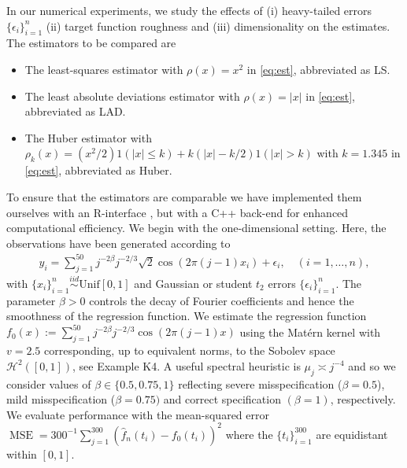 \documentclass[11pt]{article}
\theoremstyle{definition}
\theoremstyle{remark}
\DeclareMathOperator{\MSE}{MSE}
\begin{document}
In our numerical experiments, we study the effects of (i) heavy-tailed errors $\{\epsilon_i\}_{i=1}^n$ (ii) target function roughness and (iii) dimensionality on the estimates. The estimators to be compared are
\begin{itemize}
\item The least-squares estimator with $\rho(x) = x^2$ in \eqref{eq:est}, abbreviated as LS.
\item The least absolute deviations estimator with $\rho(x) = |x|$ in \eqref{eq:est}, abbreviated as LAD.
\item The Huber estimator with $\rho_{k}(x) = (x^2/2) 1(|x| \leq k) + k(|x| - k/2) 1(|x|>k)$ with $k=1.345$ in \eqref{eq:est}, abbreviated as Huber.
\end{itemize}
To ensure that the estimators are comparable we have implemented them ourselves with an \textsf{R}-interface \citep{R:2026}, but with a C++ back-end for enhanced computational efficiency. We begin with the one-dimensional setting. Here, the observations have been generated according to
\begin{align*}
y_i = \sum_{j=1}^{50} j^{-2 \beta} j^{-2/3} \sqrt{2}\cos(2 \pi(j-1) x_i) + \epsilon_i, \quad (i=1,\ldots, n),
\end{align*}
with $\{x_i\}_{i=1}^n \overset{iid}{\sim} \mathrm{Unif}[0,1]$ and Gaussian or student $t_2$ errors $\{\epsilon_i\}_{i=1}^n$. The parameter $\beta>0$ controls the decay of Fourier coefficients and hence the smoothness of the regression function. We estimate the regression function $f_0(x):=\sum_{j=1}^{50} j^{-2 \beta} j^{-2/3} \cos(2 \pi (j-1) x)$ using the Mat\'ern kernel with $v=2.5$ corresponding, up to equivalent norms, to the Sobolev space $\mathcal{H}^2([0,1])$, see Example K4. A useful spectral heuristic is $\mu_j \asymp j^{-4}$ and so we consider values of $\beta \in \{0.5, 0.75, 1\}$ reflecting severe misspecification ($\beta = 0.5$), mild misspecification ($\beta = 0.75)$ and correct specification $(\beta = 1)$, respectively. We evaluate performance with the mean-squared error $\MSE = 300^{-1} \sum_{j=1}^{300} (\widehat{f}_n(t_i)-f_0(t_i))^2$ where the $\{t_i\}_{i=1}^{300}$ are equidistant within $[0,1]$.
\end{document}
